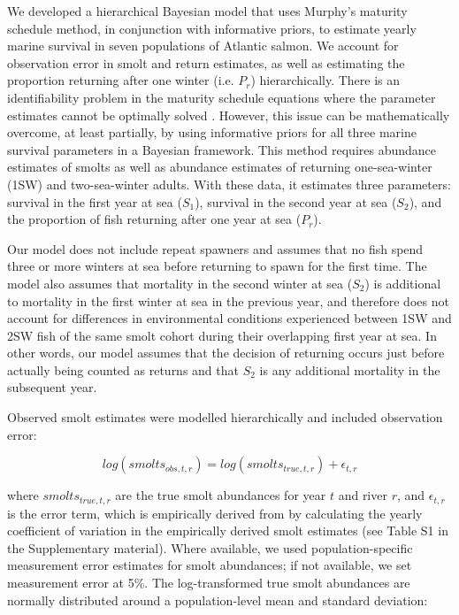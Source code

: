 \documentclass[12pt]{article}
\newcommand{\So}{$S_{1}$\xspace}
\newcommand{\St}{$S_{2}$\xspace}
\newcommand{\Pg}{$P_r$\xspace}
\newcommand{\comment}[1]{\par {\bfseries \color{blue} #1 \par}} %
\begin{document}
We developed a hierarchical Bayesian model that uses Murphy's maturity
schedule method, in conjunction with informative priors, to estimate yearly
marine survival in seven populations of Atlantic salmon. We account for
observation error in smolt and return estimates, as well as estimating the
proportion returning after one winter (i.e. \Pg) hierarchically.
There is an identifiability problem in the maturity schedule equations where
the parameter estimates cannot be optimally solved \citep{Chaput2003a}.
However, this issue can be mathematically overcome, at least partially, by
using informative priors for all three marine survival parameters in a
Bayesian framework.
This method requires abundance estimates of smolts as well as abundance estimates
of returning one-sea-winter (1SW) and two-sea-winter adults. With these data,
it estimates three parameters: survival in the first year at sea (\So), survival
in the second year at sea (\St), and the proportion of fish returning after one
year at sea (\Pg). 

Our model does not include repeat spawners and assumes that no fish spend
three or more winters at sea before returning to spawn for the first time.
The model also assumes that mortality in the second winter at sea (\St)
is additional to mortality in the first winter at sea in the previous year, 
and therefore does not account for differences in environmental conditions experienced
between 1SW and 2SW fish of the same smolt cohort during their overlapping first year at sea.
In other words, our model assumes that the decision of returning occurs just before
actually being counted as returns and that \St is any additional mortality in
the subsequent year. 


Observed smolt estimates were modelled hierarchically and included
observation error:

\begin{equation}
log(smolts_{obs,t,r}) = log(smolts_{true,t,r}) + \epsilon_{t,r}
\end{equation}

where $smolts_{true,t,r}$ are the true smolt abundances for year $t$ and river
$r$, and $\epsilon_{t,r}$ is the error term, which is empirically derived from
by calculating the yearly coefficient of variation in the empirically derived
smolt estimates (see Table S1 in the Supplementary material). 
Where available, we used population-specific measurement error estimates for smolt abundances; if not 
available, we set measurement error at 5\%. 
The log-transformed true smolt abundances are
normally distributed around a population-level mean and standard deviation:
\end{document}
